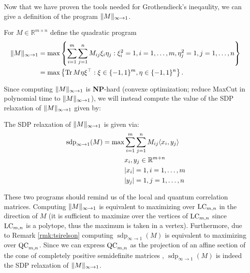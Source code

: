 	Now that we have proven the tools needed for Grothendieck's ineqaulity, we can give a definition of the program $ \Vert {M} \Vert_{\infty\to 1}$.
	
	\begin{dfn}
		For $M\in\mathbb{R}^{m\times n}$ define the quadratic program
		\begin{align}
			 \Vert {M} \Vert_{\infty\to 1} &= \max \left\{ \sum_{i=1}^m \sum_{j=1}^n M_{ij} \xi_i \eta_j : \xi_i^2=1, i=1,\dots,m, \eta_j^2=1, j =1,\dots,n \right\} \nonumber\\ 
			&=\max\left\{\textup{Tr} \, {M \eta\xi^\top } : \xi\in\{-1,1\}^m,\eta\in\{-1,1\}^n\right\}.
		\end{align}
	\end{dfn}
	
	Since computing $ \Vert {M} \Vert_{\infty\to 1}$ is \textbf{NP}-hard (convexe optimization; reduce MaxCut in polynomial time to $ \Vert {M} \Vert_{\infty\to 1}$), we will instead compute the value of the SDP relaxation of $ \Vert {M} \Vert_{\infty\to 1}$ given by:
	
	\begin{dfn} The SDP relaxation of $ \Vert {M} \Vert_{\infty\to1}$ is given via:
		\begin{align*}
			\operatorname{sdp}_{\infty\to 1} (M) = \max 
			&\sum_{i=1}^m\sum_{j=1}^n M_{ij} \langle{x_i},{y_j}\rangle\\
			&x_i,y_j\in\mathbb{R}^{m+n}\\
			&{\left|{x_i}\right|}=1, i=1,\dots,m\\
			&{\left|{y_j}\right|}=1, j=1,\dots,n
		\end{align*}
	\end{dfn}
	
	These two programs should remind us of the local and quantum correlation matrices. Computing $ \Vert {M} \Vert_{\infty\to 1}$ is equivalent to maximizing over $\textup{LC}_{m,n}$ in the direction of $M$ (it is sufficient to maximize over the vertices of $\textup{LC}_{m,n}$ since $\textup{LC}_{m,n}$ is a polytope, thus the maximum is taken in a vertex). Furthermore, due to Remark \ref{rmk:tsirelson} computing $\operatorname{sdp}_{\infty\to 1} (M)$ is equivalent to maximizing over $\textup{QC}_{m,n}$. Since we can express $\textup{QC}_{m,n}$ as the projection of an affine section of the cone of completely positive semidefinite matrices \cite{MR}, $\operatorname{sdp}_{\infty\to 1} (M)$ is indeed the SDP relaxation of $ \Vert {M} \Vert_{\infty\to 1}$. 
	
